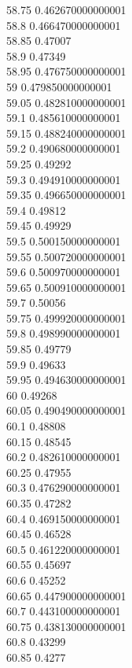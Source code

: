 {58.75	0.462670000000001\\
58.8	0.466470000000001\\
58.85	0.47007\\
58.9	0.47349\\
58.95	0.476750000000001\\
59	0.479850000000001\\
59.05	0.482810000000001\\
59.1	0.485610000000001\\
59.15	0.488240000000001\\
59.2	0.490680000000001\\
59.25	0.49292\\
59.3	0.494910000000001\\
59.35	0.496650000000001\\
59.4	0.49812\\
59.45	0.49929\\
59.5	0.500150000000001\\
59.55	0.500720000000001\\
59.6	0.500970000000001\\
59.65	0.500910000000001\\
59.7	0.50056\\
59.75	0.499920000000001\\
59.8	0.498990000000001\\
59.85	0.49779\\
59.9	0.49633\\
59.95	0.494630000000001\\
60	0.49268\\
60.05	0.490490000000001\\
60.1	0.48808\\
60.15	0.48545\\
60.2	0.482610000000001\\
60.25	0.47955\\
60.3	0.476290000000001\\
60.35	0.47282\\
60.4	0.469150000000001\\
60.45	0.46528\\
60.5	0.461220000000001\\
60.55	0.45697\\
60.6	0.45252\\
60.65	0.447900000000001\\
60.7	0.443100000000001\\
60.75	0.438130000000001\\
60.8	0.43299\\
60.85	0.4277\\
}
